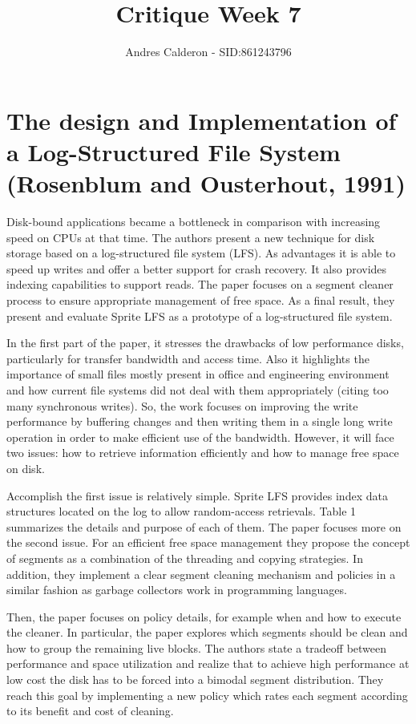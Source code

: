 \documentclass[a4paper,10pt]{scrartcl}
\title{Critique Week 7}
\author{Andres Calderon - SID:861243796}
\begin{document}
\maketitle
\thispagestyle{empty}

\section*{The design and Implementation of a Log-Structured File System (Rosenblum and Ousterhout, 1991)}
Disk-bound applications became a bottleneck in comparison with increasing speed on CPUs at that time.  The authors present a new technique for disk storage based on a log-structured file system (LFS). As advantages it is able to speed up  writes and offer a better support for crash recovery.  It also provides indexing capabilities to support reads.  The paper focuses on a segment cleaner  process to ensure appropriate management of free space.  As a final result, they present and evaluate Sprite LFS as a prototype of a log-structured file system.

In the first part of the paper, it stresses the drawbacks of low performance disks, particularly for transfer bandwidth and access time.  Also it highlights the importance of small files mostly present in office and engineering environment and how current file systems did not deal with them appropriately (citing too many synchronous writes).  So, the work focuses on improving the write performance by buffering changes and then writing them in a single long write operation in order to make efficient use of the bandwidth.  However, it will face two issues:  how to retrieve information efficiently and how to manage free space on disk.

Accomplish the first issue is relatively simple.  Sprite LFS provides index data structures located on the log to allow random-access retrievals.  Table 1 summarizes the details and purpose of each of them.  The paper focuses more on the second issue.  For an efficient free space management they propose the concept of segments as a combination of the threading and copying strategies.  In addition, they implement a clear segment cleaning mechanism and policies in a similar fashion as garbage collectors work in programming languages.

Then, the paper focuses on policy details, for example when and how to execute the cleaner.  In particular, the paper explores which segments should be clean and how to group the remaining live blocks. The authors state a tradeoff between performance and space utilization and realize that to achieve high performance at low cost the disk has to be forced into a bimodal segment distribution.  They reach this goal by implementing a new policy which rates each segment according to its benefit and cost of cleaning.  
\end{document}
